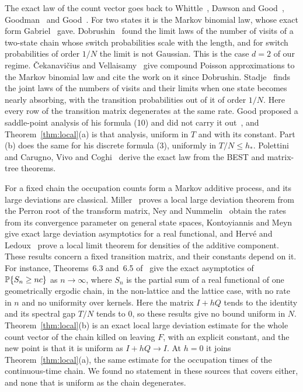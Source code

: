 The exact law of the count vector goes back to Whittle~\cite{whittle1955},
Dawson and Good~\cite{dawsongood1957}, Goodman~\cite{goodman1958} and
Good~\cite{good1961}. For two states it is the Markov binomial law, whose exact form Gabriel~\cite{gabriel1959} gave. Dobrushin~\cite{dobrushin1953} found the limit laws of the number of visits of a two-state chain whose switch probabilities
scale with the length, and for switch probabilities of order $1/N$ the limit is
not Gaussian. This is the case $d=2$ of our regime. \v{C}ekanavi\v{c}ius and
Vellaisamy~\cite{cv2010} give compound Poisson approximations to the Markov
binomial law and cite the work on it since Dobrushin. Stadje~\cite{stadje1999}
finds the joint laws of the numbers of visits and their limits when one state
becomes nearly absorbing, with the transition probabilities out of it of order
$1/N$. Here every row of the transition matrix degenerates at the same rate.
Good proposed a saddle-point analysis of his formula (10) and did not carry it
out~\cite[pp.~42--43]{good1961}, and Theorem~\ref{thm:local}(a) is that analysis,
uniform in $T$ and with its constant. Part (b) does the same for his discrete
formula (3), uniformly in $T/N\le h_*$. Polettini~\cite{polettini2015} and
Carugno, Vivo and Coghi~\cite{cvc2022} derive the exact law from the BEST and
matrix-tree theorems.

For a fixed chain the occupation counts form a Markov additive process, and its
large deviations are classical. Miller~\cite{miller1961} proves a local large deviation theorem from the Perron root of the transform matrix, Ney and Nummelin~\cite{nn1987a,nn1987b} obtain the rates from its convergence parameter on general state spaces,
Kontoyiannis and Meyn~\cite[Theorem~6.3]{km2003} give exact large deviation
asymptotics for a real functional, and Herv\'e and Ledoux~\cite{herveledoux2013}
prove a local limit theorem for densities of the additive component. These
results concern a fixed transition matrix, and their constants depend on it. For
instance, Theorems~6.3 and~6.5 of~\cite{km2003} give the exact asymptotics of
$\mathbb{P}\{S_n\ge nc\}$ as $n\to\infty$, where $S_n$ is the partial sum of a real
functional of one geometrically ergodic chain, in the non-lattice and the lattice case, with no rate in $n$ and no
uniformity over kernels. Here the matrix $I+hQ$ tends to the identity and its
spectral gap $T/N$ tends to $0$, so these results give no bound uniform in $N$.
Theorem~\ref{thm:local}(b) is an exact local large deviation estimate for the whole
count vector of the chain killed on leaving $F$, with an explicit constant, and the
new point is that it is uniform as $I+hQ\to I$. At $h=0$ it joins
Theorem~\ref{thm:local}(a), the same estimate for the occupation times of the
continuous-time chain. We found no statement in these sources that covers either,
and none that is uniform as the chain degenerates.

